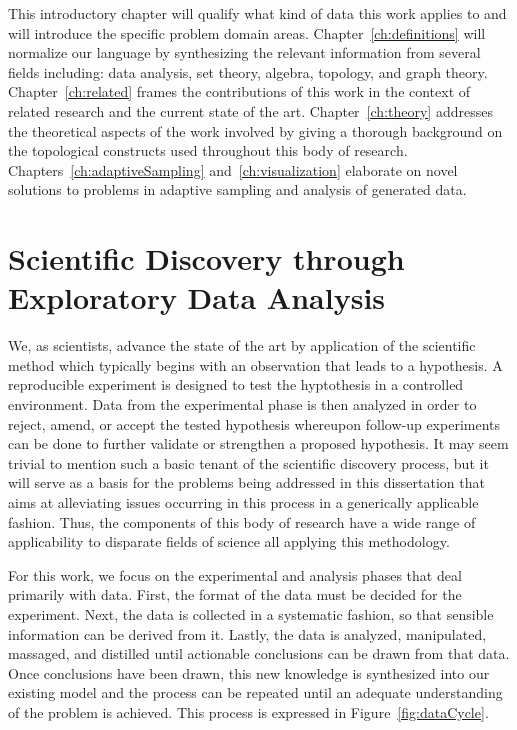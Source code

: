 This introductory chapter will qualify what kind of data this work applies to and will introduce the specific problem domain areas.
%
Chapter~\ref{ch:definitions} will normalize our language by synthesizing the relevant information from several fields including: data analysis, set theory, algebra, topology, and graph theory.
%
Chapter~\ref{ch:related} frames the contributions of this work in the context of related research and the current state of the art.
%
Chapter~\ref{ch:theory} addresses the theoretical aspects of the work involved by giving a thorough background on the topological constructs used throughout this body of research.
%
Chapters~\ref{ch:adaptiveSampling} and~\ref{ch:visualization} elaborate on novel solutions to problems in adaptive sampling and analysis of generated data.

\section{Scientific Discovery through Exploratory Data Analysis}

We, as scientists, advance the state of the art by application of the scientific method which typically begins with an observation that leads to a hypothesis.
%
A reproducible experiment is designed to test the hyptothesis in a controlled environment.
%
Data from the experimental phase is then analyzed in order to reject, amend, or accept the tested hypothesis whereupon follow-up experiments can be done to further validate or strengthen a proposed hypothesis.
%
It may seem trivial to mention such a basic tenant of the scientific discovery process, but it will serve as a basis for the problems being addressed in this dissertation that aims at alleviating issues occurring in this  process in a generically applicable fashion.
%
Thus, the components of this body of research have a wide range of applicability to disparate fields of science all applying this methodology.

For this work, we focus on the experimental and analysis phases that deal primarily with data.
%
First, the format of the data must be decided for the experiment.
%
Next, the data is collected in a systematic fashion, so that sensible information can be derived from it.
%
Lastly, the data is analyzed, manipulated, massaged, and distilled until actionable conclusions can be drawn from that data.
%
Once conclusions have been drawn, this new knowledge is synthesized into our existing model and the process can be repeated until an adequate understanding of the problem is achieved.
%
This process is expressed in Figure~\ref{fig:dataCycle}.

